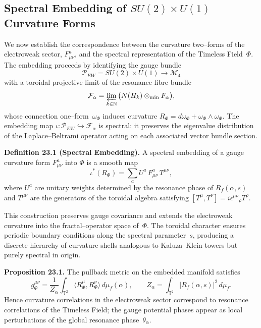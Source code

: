 \subsection{Spectral Embedding of \texorpdfstring{$SU(2)\times U(1)$}{SU(2) x U(1)} Curvature Forms}
\label{sec:spectral_embedding}

We now establish the correspondence between the curvature two--forms of the
electroweak sector, $F^{a}_{\mu\nu}$, and the spectral representation of the
Timeless Field~$\Phi$.
The embedding proceeds by identifying the gauge bundle
\[
\mathcal{P}_{EW}=SU(2)\times U(1)\longrightarrow \mathcal{M}_4
\]
with a toroidal projective limit of the resonance fibre bundle
\[
\mathcal{F}_{\alpha}=\varprojlim_{k\in\mathbb{N}} \big(N(H_k)\otimes_{\min}F_\alpha\big),
\]
whose connection one--form~$\omega_\Phi$ induces curvature
$R_\Phi=d\omega_\Phi+\omega_\Phi\wedge\omega_\Phi$.
The embedding map $\iota: \mathcal{P}_{EW}\hookrightarrow\mathcal{F}_\alpha$
is spectral: it preserves the eigenvalue distribution of the Laplace--Beltrami
operator acting on each associated vector bundle section.

\vspace{0.5em}
\noindent\textbf{Definition 23.1 (Spectral Embedding).}
A spectral embedding of a gauge curvature form
$F^{a}_{\mu\nu}$ into $\Phi$ is a smooth map
\[
\iota^{*}(R_\Phi)=
\sum_{a}U^{a}\,F^{a}_{\mu\nu}\,T^{\mu\nu},
\]
where $U^{a}$ are unitary weights determined by the
resonance phase of $R_f(\alpha,s)$ and
$T^{\mu\nu}$ are the generators of the toroidal algebra
satisfying $[T^{\mu},T^{\nu}]=i\epsilon^{\mu\nu}{}_{\rho}T^{\rho}$.

This construction preserves gauge covariance and
extends the electroweak curvature into the fractal--operator space of~$\Phi$.
The toroidal character ensures periodic boundary conditions
along the spectral parameter~$s$,
producing a discrete hierarchy of curvature shells
analogous to Kaluza--Klein towers but purely spectral in origin.

\vspace{0.5em}
\noindent\textbf{Proposition 23.1.}
The pullback metric on the embedded manifold satisfies
\[
g_{\Phi}^{\mu\nu} =
\frac{1}{Z_\alpha}
\int_{\mathbb{T}^2}
\!\!\langle R_\Phi^{\mu},R_\Phi^{\nu}\rangle\,d\mu_f(\alpha),
\qquad
Z_\alpha=\int_{\mathbb{T}^2}\!|R_f(\alpha,s)|^2\,d\mu_f.
\]
Hence curvature correlations in the electroweak sector correspond to
resonance correlations of the Timeless Field;
the gauge potential phases appear as local perturbations of
the global resonance phase~$\theta_\alpha$.

